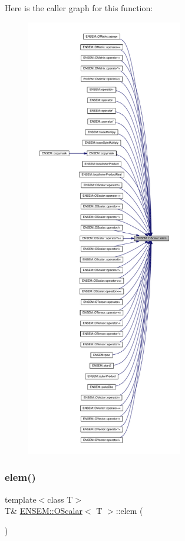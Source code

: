 Here is the caller graph for this function\+:
\nopagebreak
\begin{figure}[H]
\begin{center}
\leavevmode
\includegraphics[height=550pt]{da/d80/classENSEM_1_1OScalar_af07cc94eb09bfc29991d8fdc30727574_icgraph}
\end{center}
\end{figure}
\mbox{\label{classENSEM_1_1OScalar_af07cc94eb09bfc29991d8fdc30727574}} 
\subsubsection{\texorpdfstring{elem()}{elem()}\hspace{0.1cm}{\footnotesize\ttfamily [2/6]}}
{\footnotesize\ttfamily template$<$class T$>$ \\
T\& \mbox{\hyperlink{classENSEM_1_1OScalar}{E\+N\+S\+E\+M\+::\+O\+Scalar}}$<$ T $>$\+::elem (\begin{DoxyParamCaption}{ }\end{DoxyParamCaption})\hspace{0.3cm}{\ttfamily [inline]}}

